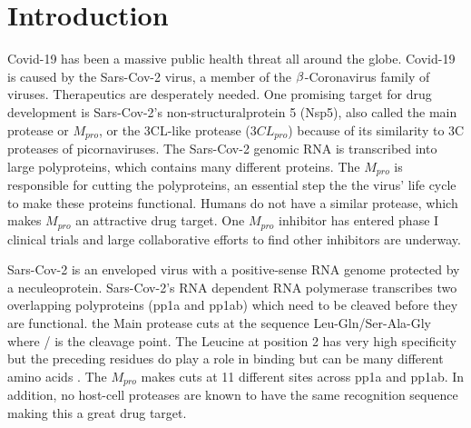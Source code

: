 \documentclass{biophys-new}
\begin{document}
\section*{Introduction}

Covid-19 has been a massive public health threat all around the globe. Covid-19 is caused by the Sars-Cov-2 virus, a member of the $\MakeUppercase{\beta}$-Coronavirus family of viruses. Therapeutics are desperately needed. One promising target for drug development is Sars-Cov-2's non-structuralprotein 5 (Nsp5), also called the main protease or $M_{pro}$, or the 3CL-like protease ($3CL_{pro}$) because of its similarity to 3C proteases of picornaviruses\cite{tan2005ph}. The Sars-Cov-2 genomic RNA is transcribed into large polyproteins, which contains many different proteins. The $M_{pro}$ is responsible for cutting the polyproteins, an essential step the the virus' life cycle to make these proteins functional. Humans do not have a similar protease, which makes $M_{pro}$ an attractive drug target. One $M_{pro}$ inhibitor has entered phase I clinical trials \cite{boras2020discovery} and large collaborative efforts to find other inhibitors are underway\cite{achdout2020covid}.

Sars-Cov-2 is an enveloped virus with a positive-sense RNA genome protected by a neculeoprotein. Sars-Cov-2's RNA dependent RNA polymerase transcribes two overlapping polyproteins (pp1a and pp1ab) which need to be cleaved before they are functional. the Main protease cuts at the sequence Leu-Gln/Ser-Ala-Gly  where / is the cleavage point\cite{Zhang409}. The Leucine at position 2 has very high specificity but the preceding residues do play a role in binding but can be many different amino acids \cite{rut2020substrate}. The $M_{pro}$ makes cuts at 11 different sites across pp1a and pp1ab. In addition, no host-cell proteases are known to have the same recognition sequence making this a great drug target\cite{hilgenfeld2014sars}. 
\end{document}
